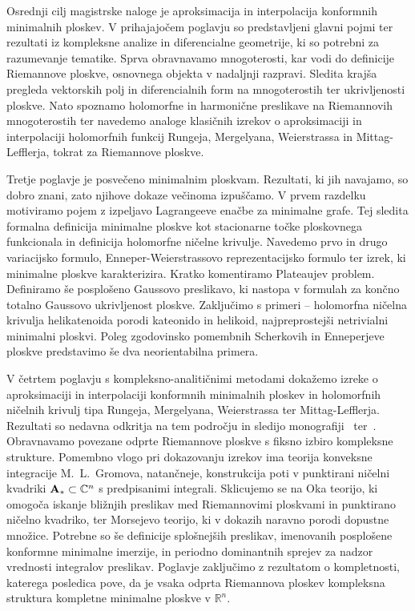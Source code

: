 \documentclass[12pt,a4paper,twoside]{article}
\theoremstyle{definition} %
\theoremstyle{plain} %
\numberwithin{equation}{section}  %
\newcommand{\R}{\mathbb R}
\newcommand{\C}{\mathbb C}
\begin{document}
Osrednji cilj magistrske naloge je aproksimacija in interpolacija konformnih minimalnih ploskev.
V prihajajočem poglavju so predstavljeni glavni pojmi ter rezultati iz kompleksne analize in diferencialne geometrije, ki so potrebni za razumevanje tematike. Sprva obravnavamo mnogoterosti, kar vodi do definicije Riemannove ploskve, osnovnega objekta v nadaljnji razpravi. Sledita krajša pregleda vektorskih polj in diferencialnih form na mnogoterostih ter ukrivljenosti ploskve. Nato spoznamo holomorfne in harmonične preslikave na Riemannovih mnogoterostih ter navedemo analoge klasičnih izrekov o aproksimaciji in interpolaciji holomorfnih funkcij Rungeja, Mergelyana, Weierstrassa in Mittag-Lefflerja, tokrat za Riemannove ploskve.

Tretje poglavje je posvečeno minimalnim ploskvam. Rezultati, ki jih navajamo, so dobro znani, zato njihove dokaze večinoma izpuščamo. V prvem razdelku motiviramo pojem z izpeljavo Lagrangeeve enačbe za minimalne grafe. Tej sledita formalna definicija minimalne ploskve kot stacionarne točke ploskovnega funkcionala in definicija holomorfne ničelne krivulje. Navedemo prvo in drugo variacijsko formulo, Enneper-Weierstrassovo reprezentacijsko formulo ter izrek, ki minimalne ploskve karakterizira. Kratko komentiramo Plateaujev problem. Definiramo še posplošeno Gaussovo preslikavo, ki nastopa v formulah za končno totalno Gaussovo ukrivljenost ploskve. Zaključimo s primeri --  holomorfna ničelna krivulja helikatenoida porodi kateonido in helikoid, najpreprostejši netrivialni
 minimalni ploskvi. Poleg zgodovinsko pomembnih Scherkovih in Enneperjeve ploskve predstavimo še dva neorientabilna primera.

V četrtem poglavju s kompleksno-analitičnimi metodami dokažemo izreke o aproksimaciji in interpolaciji konformnih minimalnih ploskev in holomorfnih ničelnih krivulj tipa Rungeja, Mergelyana, Weierstrassa ter Mittag-Lefflerja. Rezultati so nedavna odkritja na tem področju in sledijo monografiji~\cite{alarcon2021minimal} ter~\cite{alarcon2019new}.
Obravnavamo povezane odprte Riemannove ploskve s fiksno izbiro kompleksne strukture. Pomembno vlogo pri dokazovanju izrekov ima teorija konveksne integracije M.~L.~Gromova, natančneje, konstrukcija poti v punktirani ničelni kvadriki $\textup{\textbf{A}}_{*} \subset \C^{n}$ s predpisanimi integrali. Sklicujemo se na Oka teorijo, ki omogoča iskanje bližnjih preslikav med Riemannovimi ploskvami in punktirano ničelno kvadriko, ter Morsejevo teorijo, ki v dokazih naravno porodi dopustne množice. Potrebne so še definicije splošnejših preslikav, imenovanih posplošene konformne minimalne imerzije, in periodno dominantnih sprejev za nadzor vrednosti integralov preslikav. Poglavje zaključimo z rezultatom o kompletnosti, katerega posledica pove, da je vsaka odprta Riemannova ploskev kompleksna struktura kompletne minimalne ploskve v $\R^{n}$.
\end{document}
